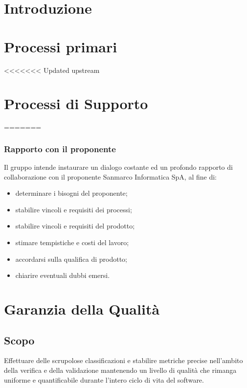 \documentclass[]{article}
\begin{document}
	
	\newpage

	\section{Introduzione}
	
	\newpage

	\section{Processi primari}
	
	\newpage

	
	\newpage

<<<<<<< Updated upstream
	\section{Processi di Supporto}
	
	\newpage
=======
					\subsubsection{Rapporto con il proponente}
						Il gruppo intende instaurare un dialogo costante ed un profondo rapporto di collaborazione con il proponente Sanmarco Informatica SpA, al fine di:
						\begin{itemize}
							\item determinare i bisogni del proponente;
							\item stabilire vincoli e  requisiti dei processi;
							\item stabilire vincoli e requisiti del prodotto;
							\item stimare tempistiche e costi del lavoro;
							\item accordarsi sulla qualifica di prodotto;
							\item chiarire eventuali dubbi emersi.
						\end{itemize}
					
					\newpage
					
					\section{Garanzia della Qualità}
					
					\subsection{Scopo}
					Effettuare delle scrupolose classificazioni e stabilire metriche precise nell'ambito della verifica e della validazione mantenendo un livello di qualità che rimanga uniforme e quantificabile durante l'intero ciclo di vita del software.
					
\end{document}
